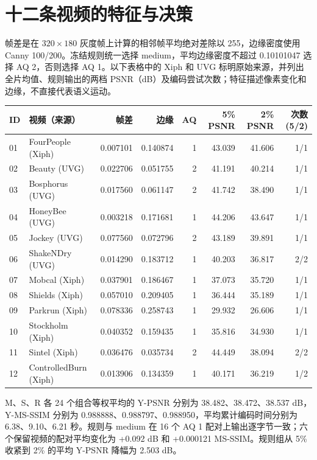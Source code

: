 \documentclass[UTF8,10pt,a4paper]{ctexart}
\begin{document}
\section{十二条视频的特征与决策}
帧差是在 $320\times180$ 灰度帧上计算的相邻帧平均绝对差除以 255，边缘密度使用 Canny 100/200。冻结规则统一选择 medium，平均边缘密度不超过 0.10101047 选择 AQ 2，否则选择 AQ 1。以下表格中的 Xiph 和 UVG 标明原始来源，并列出全片均值、规则输出的两档 PSNR（dB）及编码尝试次数；特征描述像素变化和边缘，不直接代表语义运动。
\begin{center}\small\begin{tabular}{llrrrrrr}\toprule
ID & 视频（来源） & 帧差 & 边缘 & AQ & 5\% PSNR & 2\% PSNR & 次数(5/2)\\\midrule
01 & FourPeople (Xiph) & 0.007101 & 0.140874 & 1 & 43.039 & 41.606 & 1/1 \\
02 & Beauty (UVG) & 0.022706 & 0.051755 & 2 & 41.191 & 40.214 & 1/1 \\
03 & Bosphorus (UVG) & 0.017560 & 0.061147 & 2 & 41.742 & 38.490 & 1/1 \\
04 & HoneyBee (UVG) & 0.003218 & 0.171681 & 1 & 44.206 & 43.647 & 1/1 \\
05 & Jockey (UVG) & 0.077560 & 0.072796 & 2 & 43.189 & 39.891 & 1/1 \\
06 & ShakeNDry (UVG) & 0.014290 & 0.183712 & 1 & 40.203 & 36.817 & 2/2 \\
07 & Mobcal (Xiph) & 0.037901 & 0.186467 & 1 & 37.073 & 35.720 & 1/1 \\
08 & Shields (Xiph) & 0.057010 & 0.209405 & 1 & 36.444 & 35.189 & 1/1 \\
09 & Parkrun (Xiph) & 0.078336 & 0.258743 & 1 & 29.932 & 26.606 & 1/1 \\
10 & Stockholm (Xiph) & 0.040352 & 0.159435 & 1 & 35.816 & 34.930 & 1/1 \\
11 & Sintel (Xiph) & 0.036476 & 0.035734 & 2 & 44.449 & 38.094 & 2/2 \\
12 & ControlledBurn (Xiph) & 0.013906 & 0.134359 & 1 & 40.171 & 36.219 & 1/2 \\
\bottomrule\end{tabular}\end{center}
M、S、R 各 24 个组合等权平均的 Y-PSNR 分别为 38.482、38.472、38.537 dB，Y-MS-SSIM 分别为 0.988888、0.988797、0.988950，平均累计编码时间分别为 6.38、9.10、6.21 秒。规则与 medium 在 16 个 AQ 1 配对上输出逐字节一致；六个保留视频的配对平均变化为 +0.092 dB 和 +0.000121 MS-SSIM。规则组从 5\% 收紧到 2\% 的平均 Y-PSNR 降幅为 2.503 dB。
\end{document}
